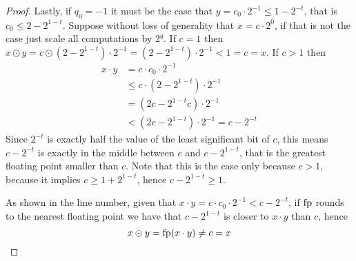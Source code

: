 \begin{proof}
	Lastly, if $q_0 = -1$ it must be the case that $y = c_0 \cdot 2^{-1} \le 1 - 2^{-t}$, that is $c_0 \le 2 - 2^{1-t}$. Suppose without loss of generality that $x = c \cdot 2^0$, if that is not the case just scale all computations by $2^q$.
	If $c = 1$ then $x \odot y = c \odot (2 - 2^{1-t}) \cdot 2^{-1} = (2 - 2^{1-t}) \cdot 2^{-1} < 1 = c = x$. If $c > 1$ then
	\begin{align*}
		x \cdot y &= c \cdot c_0 \cdot 2^{-1} \\
		&\le c \cdot (2 - 2^{1-t}) \cdot 2^{-1} \\
		&= (2 c - 2^{1-t} c) \cdot 2^{-1} \\
		&< (2 c - 2^{1-t}) \cdot 2^{-1} = c - 2^{-t}
	\end{align*}
	Since $2^{-t}$ is exactly half the value of the least significant bit of $c$, this means $c - 2^{-t}$ is exactly in the middle between $c$ and $c - 2^{1-t}$, that is the greatest floating point smaller than $c$. Note that this is the case only because $c > 1$, because it implies $c \ge 1 + 2^{1-t}$, hence $c - 2^{1-t} \ge 1$.
	\begin{center}
	\end{center}
	As shown in the line number, given that $x \cdot y = c \cdot c_0 \cdot 2^{-1} < c - 2^{-t}$, if $\text{fp}$ rounds to the nearest floating point we have that $c - 2^{1-t}$ is closer to $x \cdot y$ than $c$, hence
	\[
	x \odot y = \text{fp}(x \cdot y) \neq c = x
	\]
\end{proof}

